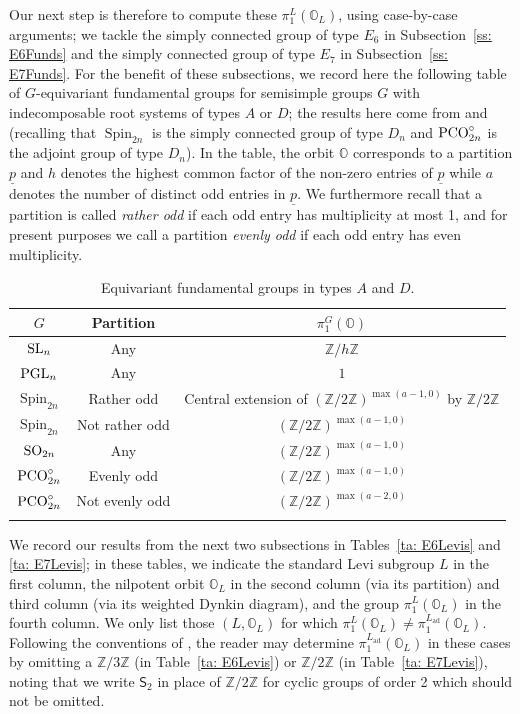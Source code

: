 \documentclass[11pt]{amsart}
\renewcommand{\O}{{\mathbb O}}
\newcommand{\bZ}{{\mathbb Z}}
\newcommand{\ad}{{\operatorname{ad}}}
\newcommand{\Spin}{{\operatorname{Spin}}}
\newcommand{\Sym}{{\mathsf{S}}}
\newcommand{\SL}{{{\mbox{\rm SL}}}}
\newcommand{\PCO}{{{\mbox{\rm PCO}}}}
\newcommand{\PGL}{{{\mbox{\rm PGL}}}}
\newcommand{\SO}{{{\mbox{\rm SO}}}}
\numberwithin{equation}{section}
\begin{document}
	Our next step is therefore to compute these $\pi_1^L(\O_L)$, using case-by-case arguments; we tackle the simply connected group of type $E_6$ in Subsection~\ref{ss: E6Funds} and the simply connected group of type $E_7$ in Subsection~\ref{ss: E7Funds}. For the benefit of these subsections, we record here the following table of $G$-equivariant fundamental groups for semisimple groups $G$ with indecomposable root systems of types $A$ or $D$; the results here come from \cite[Corollary 6.1.6]{CM} and \cite[Pages 298--299]{Car} (recalling that $\Spin_{2n}$ is the simply connected group of type $D_n$ and $\PCO_{2n}^\circ$ is the adjoint group of type $D_n$). In the table, the orbit $\O$ corresponds to a partition $\underline{p}$ and $h$ denotes the highest common factor of the non-zero entries of $\underline{p}$ while $a$ denotes the number of distinct odd entries in $\underline{p}$. We furthermore recall that a partition is called {\em rather odd} if each odd entry has multiplicity at most 1, and for present purposes we call a partition {\em evenly odd} if each odd entry has even multiplicity.
	\renewcommand{\arraystretch}{2}
	\begin{center}
		\begin{longtable}{|c|c|c|}
			\hline
			$G$ & Partition & $\pi_1^G(\O)$ \\
			\hline
			$\SL_{n}$ & Any &  $\bZ/h\bZ$ \\
			\hline
			$\PGL_n$ & Any & $1$ \\
			\hline
			$\Spin_{2n}$ & Rather odd & Central extension of $(\bZ/2\bZ)^{\max(a-1,0)}$ by $\bZ/2\bZ$ \\
			\hline
			$\Spin_{2n}$ &  Not rather odd & $(\bZ/2\bZ)^{\max(a-1,0)}$  \\
			\hline
			$\SO_{2n}$ & Any & $(\bZ/2\bZ)^{\max(a-1,0)}$ \\
			\hline 
			$\PCO_{2n}^\circ$ & Evenly odd & $(\bZ/2\bZ)^{\max(a-1,0)}$\\
			\hline
			$\PCO_{2n}^\circ$ & Not evenly odd & $(\bZ/2\bZ)^{\max(a-2,0)}$\\
			\hline
			\caption{Equivariant fundamental groups in types $A$ and $D$.}\label{ta: ADLevis}
		\end{longtable}
	\end{center}
	\renewcommand{\arraystretch}{}
	
	We record our results from the next two subsections in Tables~\ref{ta: E6Levis} and \ref{ta: E7Levis}; in these tables, we indicate the standard Levi subgroup $L$ in the first column, the nilpotent orbit $\O_L$ in the second column (via its partition) and third column (via its weighted Dynkin diagram), and the group $\pi_1^L(\O_L)$ in the fourth column. We only list those $(L,\O_L)$ for which $\pi_1^L(\O_L)\neq \pi_1^{L_\ad}(\O_L)$. Following the conventions of \cite{CM}, the reader may determine $\pi_1^{L_\ad}(\O_L)$ in these cases by omitting a $\bZ/3\bZ$ (in Table~\ref{ta: E6Levis}) or $\bZ/2\bZ$ (in Table~\ref{ta: E7Levis}), noting that we write $\Sym_2$ in place of $\bZ/2\bZ$ for cyclic groups of order 2 which should not be omitted.
	
\end{document}
